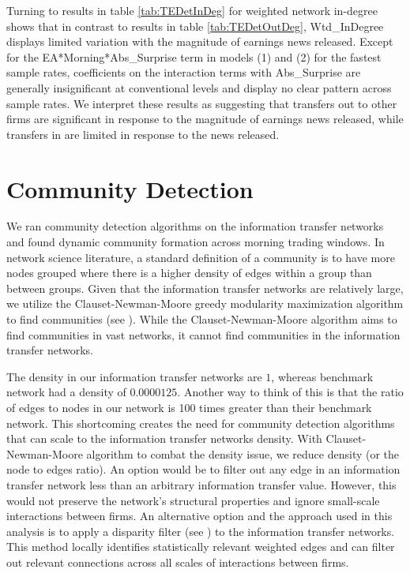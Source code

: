 Turning to results in table \ref{tab:TEDetInDeg} for weighted network in-degree shows that in contrast to results in table \ref{tab:TEDetOutDeg},  Wtd\_InDegree displays limited variation with the magnitude of earnings news released. Except for the EA*Morning*Abs\_Surprise term in models (1) and (2) for the fastest sample rates, coefficients on the interaction terms with Abs\_Surprise are generally insignificant at conventional levels and display no clear pattern across sample rates. We interpret these results as suggesting that transfers out to other firms are significant in response to the magnitude of earnings news released, while transfers in are limited in response to the news released.

\section{Community Detection}

We ran community detection algorithms on the information transfer networks and found dynamic community formation across morning trading windows.  In network science literature,  a standard definition of a community is to have more nodes grouped where there is a higher density of edges within a group than between groups.  Given that the information transfer networks are relatively large, we utilize the Clauset-Newman-Moore greedy modularity maximization algorithm to find communities (see \cite{Clauset2005}).  While the Clauset-Newman-Moore algorithm aims to find communities in vast networks, it cannot find communities in the information transfer networks. 

The density in our information transfer networks are \(1\), whereas \cite{Clauset2005} benchmark network had a density of \(0.0000125\). Another way to think of this is that the ratio of edges to nodes in our network is 100 times greater than their benchmark network. This shortcoming creates the need for community detection algorithms that can scale to the information transfer networks density.  With Clauset-Newman-Moore algorithm to combat the density issue,  we reduce density (or the node to edges ratio).  An option would be to filter out any edge in an information transfer network less than an arbitrary information transfer value.  However, this would not preserve the network's structural properties and ignore small-scale interactions between firms.  An alternative option and the approach used in this analysis is to apply a disparity filter (see \cite{Serrano}) to the information transfer networks.  This method locally identifies statistically relevant weighted edges and can filter out relevant connections across all scales of interactions between firms.  

